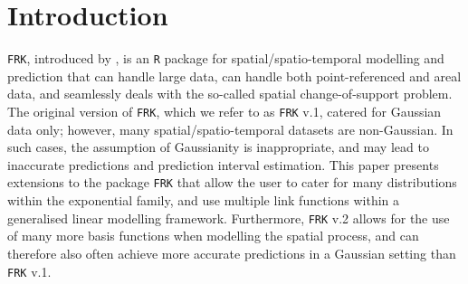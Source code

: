 \documentclass[12pt,a4paper]{article}
\begin{document}
 
\section{Introduction}\label{Chapter1}


\texttt{FRK}, introduced by \cite{FRK_paper}, is an \texttt{R} \citep{Rcoreteam_2020} package for spatial/spatio-temporal modelling and prediction that can handle large data, can handle both point-referenced and areal data, and seamlessly deals with the so-called spatial change-of-support problem. 
The original version of \texttt{FRK}, which we refer to as \texttt{FRK} v.1, catered for Gaussian data only; however, many spatial/spatio-temporal datasets are non-Gaussian. 
In such cases, the assumption of Gaussianity is inappropriate, and may lead to inaccurate predictions and prediction interval estimation.
This paper presents extensions to the package \texttt{FRK} that allow the user to cater for many distributions within the exponential family, and use multiple link functions within a generalised linear modelling framework.
Furthermore, \texttt{FRK} v.2 allows for the use of many more basis functions when modelling the spatial process, and can therefore also often achieve more accurate predictions in a Gaussian setting than \texttt{FRK} v.1. 
\end{document}
